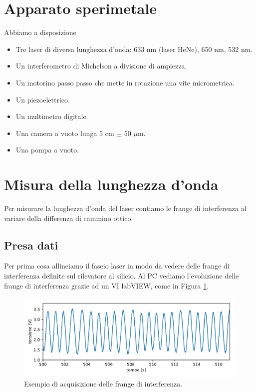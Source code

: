 \documentclass[a4paper]{article}
\begin{document}
\begin{multicols}{2}

\section{Apparato sperimetale}

	Abbiamo a disposizione 
	\begin{itemize}
		\item Tre laser di diversa lunghezza d'onda: 633 nm (laser HeNe), 650 nm, 532 nm.
		\item Un interferometro di Michelson a divisione di ampiezza.
		\item Un motorino passo passo che mette in rotazione una vite micrometrica.
		\item Un piezoelettrico.
		\item Un multimetro digitale.
		\item Una camera a vuoto lunga 5 cm $\pm$ 50 $\mu$m.
		\item Una pompa a vuoto.
	\end{itemize}

\section{Misura della lunghezza d'onda}
Per misurare la lunghezza d'onda del laser contiamo le frange di interferenza al variare della differenza di cammino ottico. 

\subsection{Presa dati}
Per prima cosa allineiamo il fascio laser in modo da vedere delle frange di interferenza definite sul rilevatore al silicio. 
Al PC vediamo l'evoluzione delle frange di interferenza grazie ad un VI labVIEW, come in Figura \ref{fig:esempio_acquisizione_frange}.

\end{multicols}

\begin{figure}[H]
	\includegraphics[width=1\textwidth]{esempio_acquisizione_frange.pdf}
	\caption{Esempio di acquisizione delle frange di interferenza.}
	\label{fig:esempio_acquisizione_frange}
\end{figure}
\end{document}
